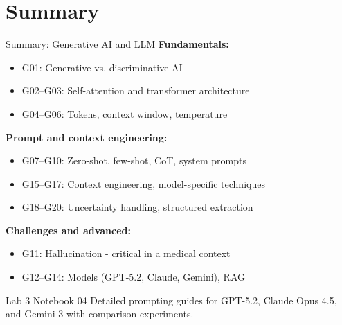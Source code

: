 \documentclass[aspectratio=169, 10pt]{beamer}
\begin{document}
\section*{Summary}

\begin{frame}{Summary: Generative AI and LLM}
    \textbf{Fundamentals:}
    \begin{itemize}
        \item G01: Generative vs. discriminative AI
        \item G02--G03: Self-attention and transformer architecture
        \item G04--G06: Tokens, context window, temperature
    \end{itemize}

    \textbf{Prompt and context engineering:}
    \begin{itemize}
        \item G07--G10: Zero-shot, few-shot, CoT, system prompts
        \item G15--G17: Context engineering, model-specific techniques
        \item G18--G20: Uncertainty handling, structured extraction
    \end{itemize}

    \textbf{Challenges and advanced:}
    \begin{itemize}
        \item G11: Hallucination - critical in a medical context
        \item G12--G14: Models (GPT-5.2, Claude, Gemini), RAG
    \end{itemize}

    \vspace{0.1cm}
    \begin{block}{\footnotesize Lab 3 Notebook 04}
        \footnotesize Detailed prompting guides for GPT-5.2, Claude Opus 4.5, and Gemini 3 with comparison experiments.
    \end{block}
\end{frame}
\end{document}
